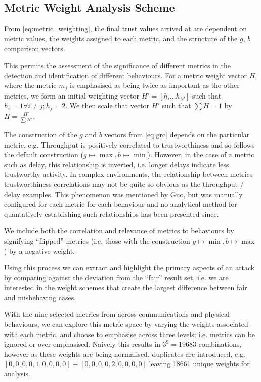 \subsection{Metric Weight Analysis Scheme}

From \eqref{eq:metric_weighting}, the final trust values arrived at are dependent on metric values, the weights assigned to each metric, and the structure of the $g$, $b$ comparison vectors.

This permits the assessment of the significance of different metrics in the detection and identification of different behaviours. 
For a metric weight vector $H$, where the metric $m_j$ is emphasised as being twice as important as the other metrics, we form an initial weighting vector $H'=[h_i...h_M]$ such that $h_i = 1 \forall i \ne j; h_j=2$. We then scale that vector $H'$ such that $\sum H = 1$ by $H= \frac{H'}{\sum H'}$.

The construction of the $g$ and $b$ vectors from \ref{eq:grc} depends on the particular metric, e.g. Throughput is positively correlated to trustworthiness and so follows the default construction ($g \mapsto \max, b \mapsto \min$).
However, in the case of a metric such as delay, this relationship is inverted, i.e. longer delays indicate less trustworthy activity.
In complex environments, the relationship between metrics trustworthiness correlations may not be quite so obvious as the throughput / delay examples.
This phenomenon was mentioned by Guo, but was manually configured for each metric for each behaviour and no analytical method for quantatively establishing such relationships has been presented since.

We include both the correlation and relevance of metrics to behaviours by signifying ``flipped'' metrics (i.e. those with the construction $g \mapsto \min, b \mapsto \max$) by a negative weight.

Using this process we can extract and highlight the primary aspects of an attack by comparing against the deviation from the ``fair'' result set, i.e. we are interested in the weight schemes that create the largest difference between fair and misbehaving cases.

With the nine selected metrics from across communications and physical behaviours, we can explore this metric space by varying the weights associated with each metric, and choose to emphasise across three levels; i.e. metrics can be ignored or over-emphasised. Naively this results in $3^9 = 19683$ combinations, however as these weights are being normalised, duplicates are introduced, e.g. $[0,0,0,0,1,0,0,0,0] \equiv [0,0,0,0,2,0,0,0,0]$ leaving 18661 unique weights for analysis.

